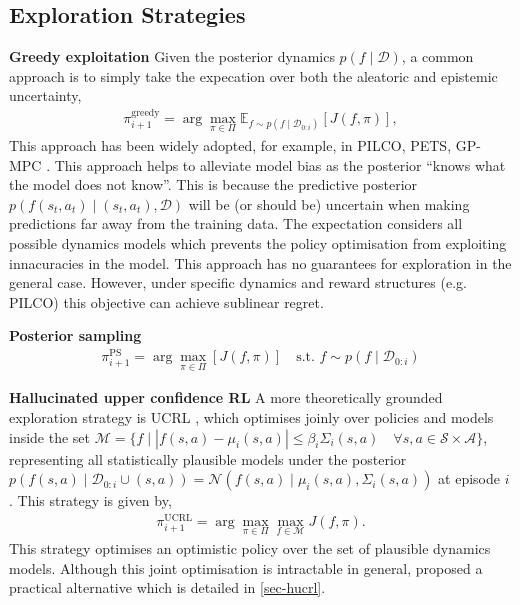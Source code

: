 \documentclass{article}
\newcommand{\dataset}{\ensuremath{\mathcal{D}}}
\newcommand{\policyDomain}{\ensuremath{\Pi}}
\newcommand{\transitionFn}{\ensuremath{f}}
\newcommand{\policy}{\ensuremath{\pi}}
\begin{document}
\subsection{Exploration Strategies}
\textbf{Greedy exploitation}
Given the posterior dynamics \(p(\transitionFn \mid \mathcal{D})\),
a common approach is to simply take the expecation over both the aleatoric and epistemic uncertainty,
\begin{align} \label{eq-greedy}
\policy_{i+1}^{\text{greedy}} = \arg \max_{\policy \in \policyDomain} \mathbb{E}_{\transitionFn \sim p(\transitionFn \mid \dataset_{0:i})} \left[ J(\transitionFn, \policy) \right],
\end{align}
This approach has been widely adopted, for example, in PILCO, PETS, GP-MPC
\cite{deisenrothPILCO2011,chuaDeepReinforcementLearning2018,kamtheDataEfficient2018}.
This approach helps to alleviate model bias as the posterior ``knows what the model does not know''.
This is because the predictive posterior \(p(f(s_{t},a_{t}) \mid (s_{t},a_{t}),  \mathcal{D} )\) will be (or should be) uncertain when making
predictions far away from the training data.
The expectation considers all possible dynamics models which prevents the policy optimisation from
exploiting innacuracies in the model.
This approach has no guarantees for exploration in the general case.
However, under specific dynamics and reward structures (e.g. PILCO) this objective can achieve sublinear regret.


\textbf{Posterior sampling}
\cite{osbandWhyPosteriorSampling2017,osbandMoreEfficientReinforcement2013}
\begin{align} \label{eq-posterior-sampling}
\policy_{i+1}^{\text{PS}} = \arg \max_{\policy \in \policyDomain} \left[ J(\transitionFn, \policy) \right] \quad \text{s.t. } \transitionFn \sim p(\transitionFn \mid \dataset_{0:i})
\end{align}

\textbf{Hallucinated upper confidence RL}
A more theoretically grounded exploration strategy is UCRL \citep{jakschNearoptimal2010}, which optimises joinly over
policies and models inside the set
\(\mathcal{M} = \{ f \mid | f(s,a) - \mu_{i}(s, a) | \leq \beta_{i} \Sigma_{i}(s, a) \quad \forall s, a \in \mathcal{S} \times \mathcal{A} \}\), representing all statistically plausible
models under the posterior \(p(f(s,a) \mid \mathcal{D}_{0:i} \cup (s,a)) = \mathcal{N}(f(s,a) \mid \mu_{i}(s,a), \Sigma_{i}(s,a))\) at episode \(i\).
This strategy is given by,
\begin{align} \label{eq-ucrl}
\policy_{i+1}^{\text{UCRL}} = \arg \max_{\policy \in \policyDomain} \max_{\transitionFn \in \mathcal{M}} J(\transitionFn, \policy).
\end{align}
This strategy optimises an optimistic policy over the set of plausible dynamics models.
Although this joint optimisation is intractable in general,
\cite{curiEfficient2020} proposed a practical alternative which is detailed in \cref{sec-hucrl}.
\end{document}
